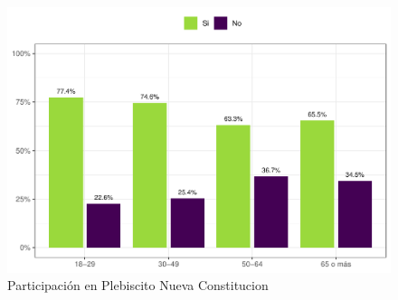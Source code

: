 \documentclass[
  12pt,
]{book}
\begin{document}
\begin{figure}

{\centering \includegraphics{reporte-elsoc_files/figure-latex/particip-edad-1} 

}

\caption{Participación en Plebiscito Nueva Constitucion}\label{fig:particip-edad}
\end{figure}
\end{document}
